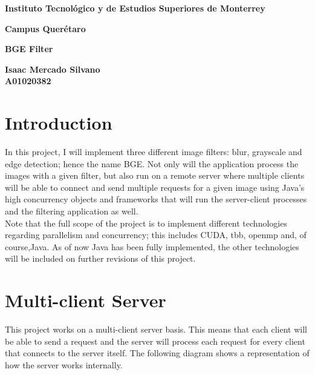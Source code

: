 \documentclass[a4paper,12pt]{article}
\begin{document}
	\begin{titlepage}
		\begin{center}
			\LARGE\textbf{Instituto Tecnol\'ogico y de Estudios Superiores de Monterrey}
			
			\vspace{0.8cm}
			
			\LARGE\textbf{Campus Quer\'etaro}
			
			\vspace{3cm}
			
			\Large\textbf{BGE Filter}
			
			\vspace{3cm}
			
			\large\textbf{Isaac Mercado Silvano}\\
			\large\textbf{A01020382}
			
			
		\end{center}
	\end{titlepage}

	\tableofcontents	

	\section{Introduction}
	
	In this project, I will implement three different image filters: blur, grayscale and edge detection; hence the name BGE. Not only will the application process the images with a given filter, but also run on a remote server where multiple clients will be able to connect and send multiple requests for a given image using Java's high concurrency objects and frameworks that will run the server-client processes and the filtering application as well.\\
	
	Note that the full scope of the project is to implement different technologies regarding parallelism and concurrency; this includes CUDA, tbb, openmp and, of course,Java. As of now Java has been fully implemented, the other technologies will be included on further revisions of this project.\\
	
	\section{Multi-client Server}
	
	This project works on a multi-client server basis. This means that each client will be able to send a request and the server will process each request for every client that connects to the server itself. The following diagram shows a representation of how the server works internally.
	
\end{document}
